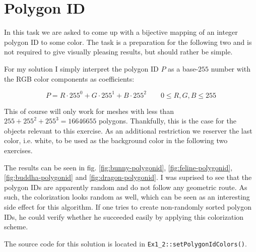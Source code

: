 \documentclass[a4paper,10pt,notitlepage]{scrreprt}
\begin{document}
\section{Polygon ID}

In this task we are asked to come up with a bijective mapping of an integer
polygon ID to some color. The task is a preparation for the following two and
is not required to give visually pleasing results, but should rather be simple.

For my solution I simply interpret the polygon ID $P$ as a base-$255$ number
with the RGB color components as coefficients:

\begin{equation}
 P = R \cdot 255^0 + G \cdot 255^1 + B \cdot 255^2 \qquad 0 \leq R,G,B \leq
255
\end{equation}

This of course will only work for meshes with less than
$255+255^2+255^3=16646655$ polygons. Thankfully, this is the case for the
objects relevant to this exercise. As an additional restriction we reserver the
last color, i.e. white, to be used as the background color in the following two
exercises.

The results can be seen in fig. \ref{fig:bunny-polygonid},
\ref{fig:feline-polygonid}, \ref{fig:buddha-polygonid} and
\ref{fig:dragon-polygonid}. I was
suprised to see that the polygon IDs are apparently random and do not follow
any geometric route. As such, the colorization looks random as well, which can
be seen as an interesting side effect for this algorithm. If one tries to
create non-randomly sorted polygon IDs, he could verify whether he succeeded
easily by applying this colorization scheme.

The source code for this solution is located in
\texttt{Ex1\_2::setPolygonIdColors()}.
\end{document}
